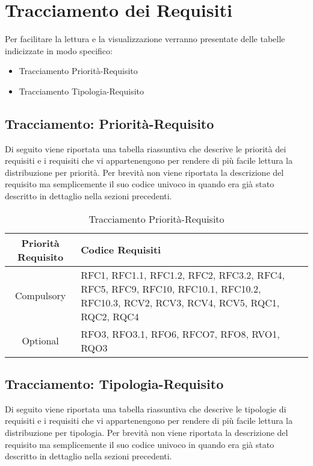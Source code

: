 
\section{Tracciamento dei Requisiti}
Per facilitare la lettura e la visualizzazione verranno presentate delle tabelle indicizzate in modo specifico:
\begin{itemize}
    \item Tracciamento Priorità-Requisito
    \item Tracciamento Tipologia-Requisito
\end{itemize}

\newpage
\subsection{Tracciamento: Priorità-Requisito}
Di seguito viene riportata una tabella riassuntiva che descrive le priorità dei requisiti e i requisiti che vi appartenengono per rendere di più facile lettura la distribuzione per priorità.
Per brevità non viene riportata la descrizione del requisito ma semplicemente il suo codice univoco in quando era già stato descritto in dettaglio nella sezioni precedenti.   

\begin{table}[!htbp] %
            \centering
            \renewcommand{\arraystretch}{2} %
            \begin{tabular}{|c|p{2cm}|} %
                \rowcolor{orange!50} %
        		\hline
        		\textbf{Priorità Requisito} & \textbf{Codice Requisiti} \\
                \hline
                Compulsory & RFC1, RFC1.1, RFC1.2, RFC2, RFC3.2, RFC4, RFC5, RFC9, RFC10, RFC10.1, RFC10.2, RFC10.3, RCV2, RCV3, RCV4, RCV5, RQC1, RQC2, RQC4\\
                \hline
                Optional & RFO3, RFO3.1, RFO6, RFCO7, RFO8, RVO1, RQO3\\
                \hline
        \end{tabular}
        \caption{Tracciamento Priorità-Requisito} %
\end{table}

\newpage
\subsection{Tracciamento: Tipologia-Requisito}
Di seguito viene riportata una tabella riassuntiva che descrive le tipologie di requisiti e i requisiti che vi appartenengono per rendere di più facile lettura la distribuzione per tipologia.
Per brevità non viene riportata la descrizione del requisito ma semplicemente il suo codice univoco in quando era già stato descritto in dettaglio nella sezioni precedenti.

